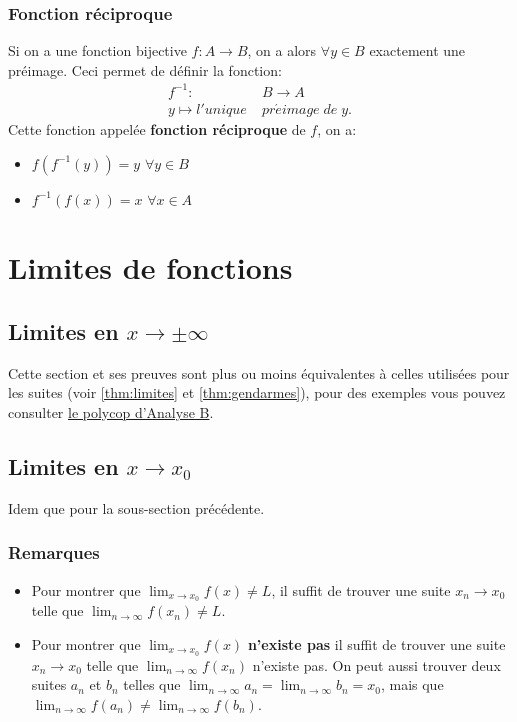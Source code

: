 \documentclass[10pt,a4paper]{book}
\begin{document}
\subsection{Fonction réciproque}
Si on a une fonction bijective $f: A \rightarrow B$, on a alors $\forall y \in B$ exactement une préimage. Ceci permet de définir la fonction:
\begin{equation*}
\begin{split}
f^{-1}: & B \rightarrow A \\
y \mapsto l'unique \; & pr\acute{e}image \; de \; y.
\end{split}
\end{equation*}
Cette fonction appelée \textbf{fonction réciproque} de $f$, on a:
\begin{itemize}
\item $f(f^{-1}(y))=y$ $\forall y \in B$
\item $f^{-1}(f(x))=x$ $\forall x \in A$
\end{itemize}

\chapter{Limites de fonctions}

\section{Limites en \texorpdfstring{$x \rightarrow \pm \infty$}{l'infini}}

Cette section et ses preuves sont plus ou moins équivalentes à celles utilisées pour les suites (voir \ref{thm:limites} et \ref{thm:gendarmes}), pour des exemples vous pouvez consulter \href{https://botafogo.saitis.net/analyse-B/?page=m_limitesfonctions_x_tendant_infini}{le polycop d'Analyse B}.

\section{Limites en \texorpdfstring{$x \rightarrow x_0$}{x0}}

Idem que pour la sous-section précédente.

\subsection{Remarques}
\begin{itemize}
\item Pour montrer que $\lim_{x \rightarrow x_0}f(x) \neq L$, il suffit de trouver une suite $x_n \rightarrow x_0$ telle que $\lim_{n \rightarrow \infty}f(x_n) \neq L$.
\item Pour montrer que $\lim_{x \rightarrow x_0}f(x)$ \textbf{n'existe pas} il suffit de trouver une suite $x_n \rightarrow x_0$ telle que $\lim_{n \rightarrow \infty}f(x_n)$ n'existe pas. On peut aussi trouver deux suites $a_n$ et $b_n$ telles que $\lim_{n \rightarrow \infty} a_n = \lim_{n \rightarrow \infty} b_n = x_0$, mais que $\lim_{n \rightarrow \infty} f(a_n) \neq \lim_{n \rightarrow \infty} f(b_n)$.
\end{itemize}
\end{document}
